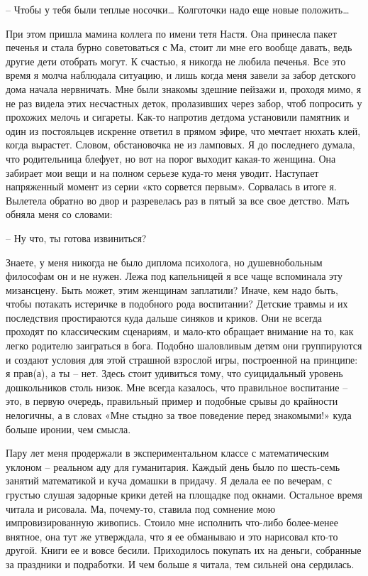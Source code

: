 \documentclass[
]{book}
\begin{document}
-- Чтобы у тебя были теплые носочки\ldots{} Колготочки надо еще новые положить\ldots{}

При этом пришла мамина коллега по имени тетя Настя. Она принесла пакет печенья и стала бурно советоваться с Ма, стоит ли мне его вообще давать, ведь другие дети отобрать могут. К счастью, я никогда не любила печенья. Все это время я молча наблюдала ситуацию, и лишь когда меня завели за забор детского дома начала нервничать. Мне были знакомы здешние пейзажи и, проходя мимо, я не раз видела этих несчастных деток, пролазивших через забор, чтоб попросить у прохожих мелочь и сигареты. Как-то напротив детдома установили памятник и один из постояльцев искренне ответил в прямом эфире, что мечтает нюхать клей, когда вырастет. Словом, обстановочка не из ламповых. Я до последнего думала, что родительница блефует, но вот на порог выходит какая-то женщина. Она забирает мои вещи и на полном серьезе куда-то меня уводит. Наступает напряженный момент из серии «кто сорвется первым». Сорвалась в итоге я. Вылетела обратно во двор и разревелась раз в пятый за все свое детство. Мать обняла меня со словами:

-- Ну что, ты готова извиниться?

Знаете, у меня никогда не было диплома психолога, но душевнобольным философам он и не нужен. Лежа под капельницей я все чаще вспоминала эту мизансцену. Быть может, этим женщинам заплатили? Иначе, кем надо быть, чтобы потакать истеричке в подобного рода воспитании? Детские травмы и их последствия простираются куда дальше синяков и криков. Они не всегда проходят по классическим сценариям, и мало-кто обращает внимание на то, как легко родителю заиграться в бога. Подобно шаловливым детям они группируются и создают условия для этой страшной взрослой игры, построенной на принципе: я прав(а), а ты -- нет. Здесь стоит удивиться тому, что суицидальный уровень дошкольников столь низок. Мне всегда казалось, что правильное воспитание -- это, в первую очередь, правильный пример и подобные срывы до крайности нелогичны, а в словах «Мне стыдно за твое поведение перед знакомыми!» куда больше иронии, чем смысла.

Пару лет меня продержали в экспериментальном классе с математическим уклоном -- реальном аду для гуманитария. Каждый день было по шесть-семь занятий математикой и куча домашки в придачу. Я делала ее по вечерам, с грустью слушая задорные крики детей на площадке под окнами. Остальное время читала и рисовала. Ма, почему-то, ставила под сомнение мою импровизированную живопись. Стоило мне исполнить что-либо более-менее внятное, она тут же утверждала, что я ее обманываю и это нарисовал кто-то другой. Книги ее и вовсе бесили. Приходилось покупать их на деньги, собранные за праздники и подработки. И чем больше я читала, тем сильней она сердилась.
\end{document}
